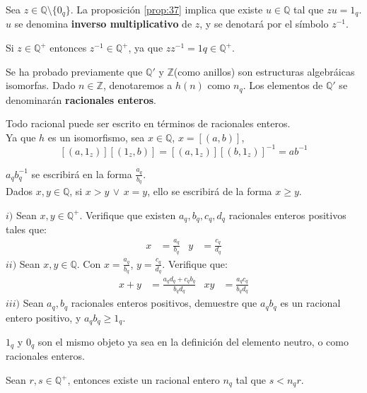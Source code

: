 \begin{notation} Sea $z \in \mathbb{Q}\setminus \{0_q\}$. La
  proposición \eqref{prop:37} implica que existe $u \in \mathbb{Q}$ tal que
  $zu = 1_q$. $u$ se denomina \textbf{inverso multiplicativo} de $z$, y se
  denotará por el símbolo $z^{-1}$.
\end{notation}
\begin{remark}
  Si $z \in \mathbb{Q}^+$ entonces $z^{-1} \in \mathbb{Q}^+$, ya que
  $zz^{-1}=1q \in \mathbb{Q}^+$.
\end{remark}
Se ha probado previamente que $\mathbb{Q}'$ y $\mathbb{Z}$(como anillos) son
estructuras algebráicas isomorfas. Dado $n \in \mathbb{Z}$, denotaremos a $h(n)$
como $n_q$. Los elementos de $\mathbb{Q}'$ se denominarán \textbf{racionales
enteros}.\\
\begin{remark}
  Todo racional puede ser escrito en términos de racionales enteros.\\
  Ya que $h$ es un isomorfismo, sea $x \in \mathbb{Q}$, $x = [(a,b)]$, 
  \[
    [(a, 1_z)] [(1_z,b)] = [(a, 1_z)][(b, 1_z)]^{-1}= ab^{-1}
  \]
\end{remark}
\begin{notation}
  $a_qb_q^{-1}$ se escribirá en la forma $\frac{a_q}{b_q}$.\\
  Dados $x,y \in \mathbb{Q}$, si $x>y\, \lor \, x=y$, ello se escribirá de la
  forma $x \geq y$.
\end{notation}
\begin{problem}
  $i)$ Sean $x,y \in \mathbb{Q}^+$. Verifique que existen $a_q,b_q,c_q,d_q$
  racionales enteros positivos tales que:
  \begin{align*}
    x &= \frac{a_q}{b_q} & y &= \frac{c_q}{d_q}
  \end{align*}
  $ii)$ Sean $x,y \in \mathbb{Q}$. Con $x = \frac{a_q}{b_q}$, $y =
  \frac{c_q}{d_q}$. Verifique que:
  \begin{align*}
    x+y &= \frac{a_qd_q + c_qb_q}{b_qd_q} & xy &= \frac{a_qc_q}{b_qd_q}
  \end{align*}
  $iii)$ Sean $a_q, b_q$ racionales enteros positivos, demuestre que $a_qb_q$
  es un racional entero positivo, y $a_qb_q \geq 1_q$.
\end{problem}
\begin{remark}
  $1_q$ y $0_q$ son el mismo objeto ya sea en la definición del elemento
  neutro, o como racionales enteros. 
\end{remark}
\begin{proposition}\label{prop:40}
  Sean $r,s \in \mathbb{Q^+}$, entonces existe un racional entero $n_q$ tal
  que $s < n_qr$.
\end{proposition}
